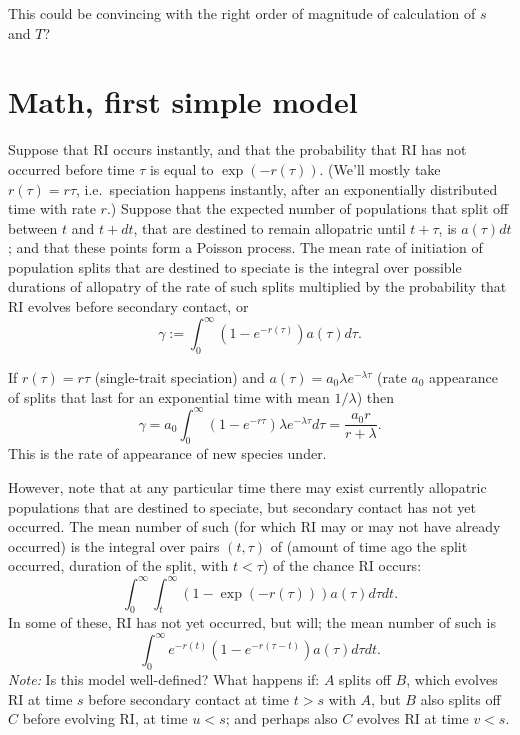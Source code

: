 \documentclass{article}
\begin{document}
This could be convincing with the right order of magnitude of calculation of $s$ and $T$?


\section{Math, first simple model}

Suppose that RI occurs instantly, and that the probability that RI has not occurred before time $\tau$ is equal to $\exp(-r(\tau))$.
(We'll mostly take $r(\tau) = r\tau$, i.e.\ speciation happens instantly, after an exponentially distributed time with rate $r$.)
Suppose that the expected number of populations that split off between $t$ and $t+dt$,
that are destined to remain allopatric until $t+\tau$,
is $a(\tau) dt$; and that these points form a Poisson process.
The mean rate of initiation of population splits that are destined to speciate is
the integral over possible durations of allopatry
of the rate of such splits multiplied by the probability that RI evolves before secondary contact, or
\[
 \gamma := \int_0^\infty (1-e^{-r(\tau)}) a(\tau) d\tau  .
\]

If $r(\tau) = r \tau$ (single-trait speciation)
and $a(\tau) = a_0 \lambda e^{-\lambda \tau}$ (rate $a_0$ appearance of splits that last for an exponential time with mean $1/\lambda$)
then
\[
\gamma = a_0 \int_0^\infty (1-e^{-r\tau}) \lambda e^{-\lambda \tau} d\tau = \frac{a_0 r}{r+\lambda} .
\]
This is the rate of appearance of new species under.

However, note that at any particular time there may exist currently allopatric populations that are destined to speciate,
but secondary contact has not yet occurred.
The mean number of such (for which RI may or may not have already occurred)
is the integral over pairs $(t,\tau)$ of (amount of time ago the split occurred, duration of the split, with $t < \tau$)
of the chance RI occurs:
\[
\int_0^\infty \int_t^\infty (1-\exp(-r(\tau))) a(\tau) d\tau dt .
\]
In some of these, RI has not yet occurred, but will;
the mean number of such is
\[
\int_0^\infty e^{-r(t)} ( 1- e^{-r(\tau-t)} ) a(\tau) d\tau dt .
\]
\emph{Note:} Is this model well-defined?  
What happens if: $A$ splits off $B$, 
which evolves RI at time $s$ before secondary contact at time $t>s$ with $A$,
but $B$ also splits off $C$ before evolving RI, at time $u<s$; and perhaps also $C$ evolves RI at time $v<s$.
\end{document}
